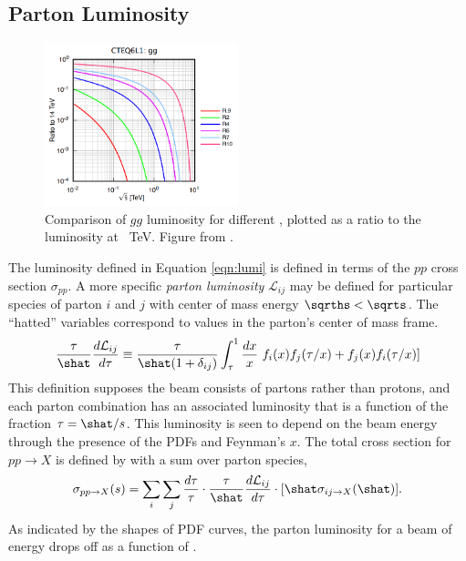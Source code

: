 \subsection{Parton Luminosity}

\begin{figure}[h!]
\captionsetup[subfigure]{position=b}
\centering
\includegraphics[width=0.5\textwidth]{figures/pheno/partonLumi.png}
\caption{Comparison of $gg$ luminosity for different \sqrts, plotted as a ratio to the luminosity at ~TeV. Figure from \cite{quigg}.}
\label{fig:partonLumi}
\end{figure}

The luminosity defined in Equation \ref{eqn:lumi} is defined in terms of the $pp$ cross section $\sigma_{pp}$.
A more specific \emph{parton luminosity} $\mathcal{L}_{ij}$ may be defined for particular species of parton $i$ and $j$ with center of mass energy $\sqrths<\sqrts$.
The ``hatted'' variables correspond to values in the parton's center of mass frame.
\begin{equation}\begin{split}\label{eqn:partonLumi}
\frac{\tau}{\shat}\frac{d\mathcal{L}_{ij}}{d\tau}\equiv\frac{\tau}{\shat(1+\delta_{ij})} \int_\tau^1 \frac{dx}{x}~f_i(x)f_j(\tau/x)+f_j(x)f_i(\tau/x)]
\end{split}\end{equation}
This definition supposes the beam consists of partons rather than protons, and each parton combination has an associated luminosity that is a function of the fraction $\tau=\shat/s$.
This luminosity is seen to depend on the beam energy through the presence of the PDFs and Feynman's $x$.
The total cross section for $pp\to X$ is defined by with a sum over parton species,
\begin{equation}\begin{split}
\sigma_{pp\to X}(s)=\sum_i\sum_j \frac{d\tau}{\tau}\cdot\frac{\tau}{\shat}\frac{d\mathcal{L}_{ij}}{d\tau}\cdot[\shat\sigma_{ij\to X}(\shat)].
\end{split}\end{equation} 
As indicated by the shapes of PDF curves, the parton luminosity for a beam of energy \sqrts drops off as a function of \sqrths.
\cite{quigg}

